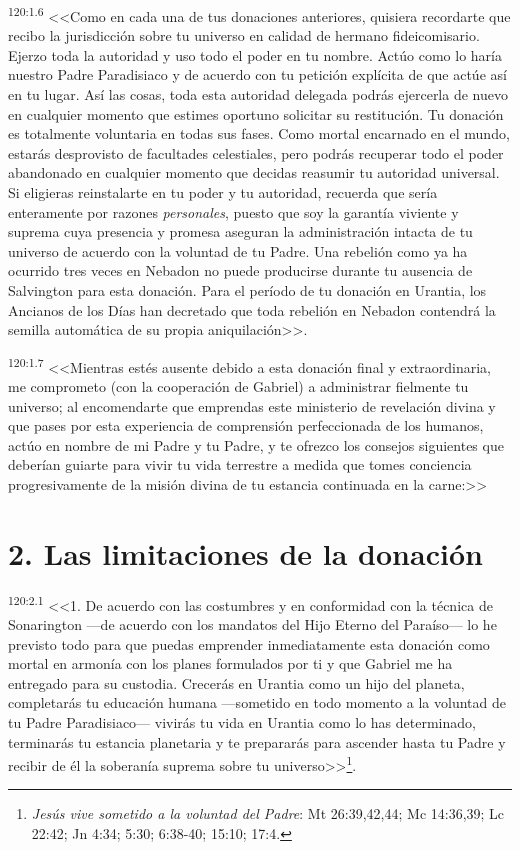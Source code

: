\par 
\textsuperscript{120:1.6} <<Como en cada una de tus donaciones anteriores, quisiera recordarte que recibo la jurisdicción sobre tu universo en calidad de hermano fideicomisario. Ejerzo toda la autoridad y uso todo el poder en tu nombre. Actúo como lo haría nuestro Padre Paradisiaco y de acuerdo con tu petición explícita de que actúe así en tu lugar. Así las cosas, toda esta autoridad delegada podrás ejercerla de nuevo en cualquier momento que estimes oportuno solicitar su restitución. Tu donación es totalmente voluntaria en todas sus fases. Como mortal encarnado en el mundo, estarás desprovisto de facultades celestiales, pero podrás recuperar todo el poder abandonado en cualquier momento que decidas reasumir tu autoridad universal. Si eligieras reinstalarte en tu poder y tu autoridad, recuerda que sería enteramente por razones \textit{personales}, puesto que soy la garantía viviente y suprema cuya presencia y promesa aseguran la administración intacta de tu universo de acuerdo con la voluntad de tu Padre. Una rebelión como ya ha ocurrido tres veces en Nebadon no puede producirse durante tu ausencia de Salvington para esta donación. Para el período de tu donación en Urantia, los Ancianos de los Días han decretado que toda rebelión en Nebadon contendrá la semilla automática de su propia aniquilación>>.

\par 
\textsuperscript{120:1.7} <<Mientras estés ausente debido a esta donación final y extraordinaria, me comprometo (con la cooperación de Gabriel) a administrar fielmente tu universo; al encomendarte que emprendas este ministerio de revelación divina y que pases por esta experiencia de comprensión perfeccionada de los humanos, actúo en nombre de mi Padre y tu Padre, y te ofrezco los consejos siguientes que deberían guiarte para vivir tu vida terrestre a medida que tomes conciencia progresivamente de la misión divina de tu estancia continuada en la carne:>>

\section*{2. Las limitaciones de la donación}
\par 
\textsuperscript{120:2.1} <<1. De acuerdo con las costumbres y en conformidad con la técnica de Sonarington ---de acuerdo con los mandatos del Hijo Eterno del Paraíso--- lo he previsto todo para que puedas emprender inmediatamente esta donación como mortal en armonía con los planes formulados por ti y que Gabriel me ha entregado para su custodia. Crecerás en Urantia como un hijo del planeta, completarás tu educación humana ---sometido en todo momento a la voluntad de tu Padre Paradisiaco--- vivirás tu vida en Urantia como lo has determinado, terminarás tu estancia planetaria y te prepararás para ascender hasta tu Padre y recibir de él la soberanía suprema sobre tu universo>>\footnote{\textit{Jesús vive sometido a la voluntad del Padre}: Mt 26:39,42,44; Mc 14:36,39; Lc 22:42; Jn 4:34; 5:30; 6:38-40; 15:10; 17:4.}.

